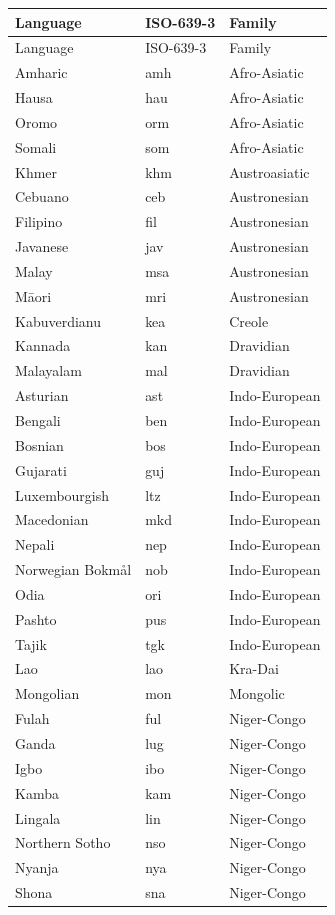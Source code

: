 \begin{longtable}{lll}\toprule Language & ISO-639-3 & Family\\ \midrule\endfirsthead\toprule Language & ISO-639-3 & Family\\ \midrule\endhead
Amharic & amh & Afro-Asiatic\\
Hausa & hau & Afro-Asiatic\\
Oromo & orm & Afro-Asiatic\\
Somali & som & Afro-Asiatic\\
Khmer & khm & Austroasiatic\\
Cebuano & ceb & Austronesian\\
Filipino & fil & Austronesian\\
Javanese & jav & Austronesian\\
Malay & msa & Austronesian\\
Māori & mri & Austronesian\\
Kabuverdianu & kea & Creole\\
Kannada & kan & Dravidian\\
Malayalam & mal & Dravidian\\
Asturian & ast & Indo-European\\
Bengali & ben & Indo-European\\
Bosnian & bos & Indo-European\\
Gujarati & guj & Indo-European\\
Luxembourgish & ltz & Indo-European\\
Macedonian & mkd & Indo-European\\
Nepali & nep & Indo-European\\
Norwegian Bokmål & nob & Indo-European\\
Odia & ori & Indo-European\\
Pashto & pus & Indo-European\\
Tajik & tgk & Indo-European\\
Lao & lao & Kra-Dai\\
Mongolian & mon & Mongolic\\
Fulah & ful & Niger-Congo\\
Ganda & lug & Niger-Congo\\
Igbo & ibo & Niger-Congo\\
Kamba & kam & Niger-Congo\\
Lingala & lin & Niger-Congo\\
Northern Sotho & nso & Niger-Congo\\
Nyanja & nya & Niger-Congo\\
Shona & sna & Niger-Congo\\

\end{longtable}
